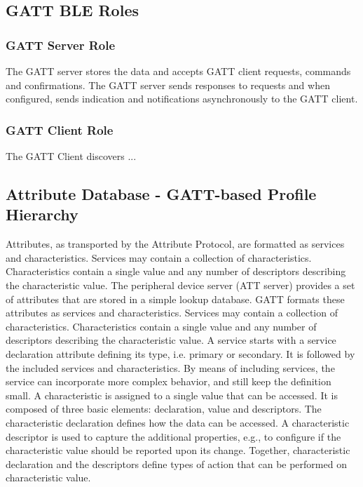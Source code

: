 \documentclass[a4paper,titlepage,oneside,12pt]{amsart} %
\begin{document}
\subsection{GATT BLE Roles}
\subsubsection{GATT Server Role}
The GATT server stores the data and accepts GATT client requests, commands and confirmations. The GATT server sends responses to requests and when configured, sends indication and notifications asynchronously to the GATT client. 

\subsubsection{GATT Client Role}
The GATT Client discovers ...

% 

\subsection{Attribute Database - GATT-based Profile Hierarchy}
Attributes, as transported by the Attribute Protocol, are formatted as services and characteristics. Services may contain a collection of characteristics. Characteristics contain a single value and any number of descriptors describing the characteristic value. The peripheral device server (ATT server) provides a set of attributes that are stored in a simple lookup database. GATT formats these attributes as services and characteristics. Services may contain a collection of characteristics. Characteristics contain a single value and any number of descriptors describing the characteristic value. A service starts with a service declaration attribute defining its type, i.e. primary or secondary. It is followed by the included services and characteristics. By means of including services, the service can incorporate more complex behavior, and still keep the definition small. A characteristic is assigned to a single value that can be accessed. It is composed of three basic elements: declaration, value and descriptors. The characteristic declaration defines how the data can be accessed. A characteristic descriptor is used to capture the additional properties, e.g., to configure if the characteristic value should be reported upon its change. Together, characteristic declaration and the descriptors define types of action that can be performed on characteristic value.
\end{document}
